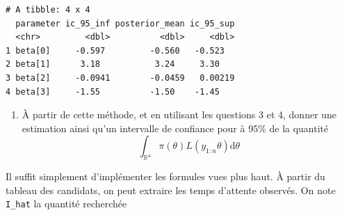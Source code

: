 \documentclass[]{article}
\newenvironment{Shaded}{\begin{snugshade}}{\end{snugshade}}
\newcommand{\CommentTok}[1]{\textcolor[rgb]{0.56,0.35,0.01}{\textit{#1}}}
\newcommand{\DataTypeTok}[1]{\textcolor[rgb]{0.13,0.29,0.53}{#1}}
\newcommand{\FloatTok}[1]{\textcolor[rgb]{0.00,0.00,0.81}{#1}}
\newcommand{\KeywordTok}[1]{\textcolor[rgb]{0.13,0.29,0.53}{\textbf{#1}}}
\newcommand{\NormalTok}[1]{#1}
\newcommand{\OperatorTok}[1]{\textcolor[rgb]{0.81,0.36,0.00}{\textbf{#1}}}
\newcommand{\StringTok}[1]{\textcolor[rgb]{0.31,0.60,0.02}{#1}}
\providecommand{\tightlist}{%
  \setlength{\itemsep}{0pt}\setlength{\parskip}{0pt}}
\newenvironment{Correction}%
  { \vspace{\baselineskip}\begin{mdframed}[backgroundcolor=my_green]}%
  {\end{mdframed}}
\begin{document}
\begin{Shaded}
\end{Shaded}

\begin{verbatim}
# A tibble: 4 x 4
  parameter ic_95_inf posterior_mean ic_95_sup
  <chr>         <dbl>          <dbl>     <dbl>
1 beta[0]     -0.597         -0.560   -0.523  
2 beta[1]      3.18           3.24     3.30   
3 beta[2]     -0.0941        -0.0459   0.00219
4 beta[3]     -1.55          -1.50    -1.45   
\end{verbatim}

\begin{enumerate}
\def\labelenumi{\arabic{enumi}.}
\setcounter{enumi}{8}
\tightlist
\item
  À partir de cette méthode, et en utilisant les questions 3 et 4,
  donner une estimation ainsi qu'un intervalle de confiance pour à 95\%
  de la quantité
  \[\int_{\mathbb{R}^4}\pi(\theta)L(y_{1:n}\theta) \text{d} \theta\]
\end{enumerate}

\begin{Correction}
Il suffit simplement d'implémenter les formules vues plus haut. À partir du tableau des candidats, on peut extraire les temps d'attente observés.
On note \texttt{I\_hat} la quantité recherchée
\end{Correction}
\end{document}

